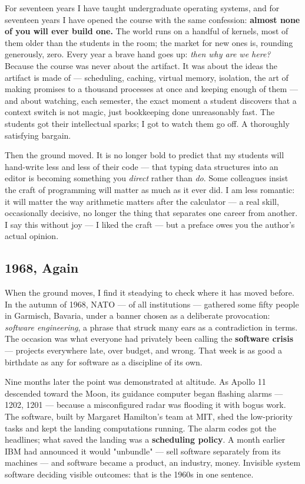 
For seventeen years I have taught undergraduate operating systems, and for seventeen years I have opened the course with the same confession: \textbf{almost none of you will ever build one.} The world runs on a handful of kernels, most of them older than the students in the room; the market for new ones is, rounding generously, zero. Every year a brave hand goes up: \textit{then why are we here?} Because the course was never about the artifact. It was about the ideas the artifact is made of — scheduling, caching, virtual memory, isolation, the art of making promises to a thousand processes at once and keeping enough of them — and about watching, each semester, the exact moment a student discovers that a context switch is not magic, just bookkeeping done unreasonably fast. The students got their intellectual sparks; I got to watch them go off. A thoroughly satisfying bargain.

Then the ground moved. It is no longer bold to predict that my students will hand-write less and less of their code — that typing data structures into an editor is becoming something you \textit{direct} rather than \textit{do}. Some colleagues insist the craft of programming will matter as much as it ever did. I am less romantic: it will matter the way arithmetic matters after the calculator — a real skill, occasionally decisive, no longer the thing that separates one career from another. I say this without joy — I liked the craft — but a preface owes you the author's actual opinion.

\subsection*{1968, Again}

When the ground moves, I find it steadying to check where it has moved before. In the autumn of 1968, NATO — of all institutions — gathered some fifty people in Garmisch, Bavaria, under a banner chosen as a deliberate provocation: \textit{software engineering}, a phrase that struck many ears as a contradiction in terms. The occasion was what everyone had privately been calling the \textbf{software crisis} — projects everywhere late, over budget, and wrong. That week is as good a birthdate as any for software as a discipline of its own.

Nine months later the point was demonstrated at altitude. As Apollo 11 descended toward the Moon, its guidance computer began flashing alarms — 1202, 1201 — because a misconfigured radar was flooding it with bogus work. The software, built by Margaret Hamilton's team at MIT, shed the low-priority tasks and kept the landing computations running. The alarm codes got the headlines; what saved the landing was a \textbf{scheduling policy}. A month earlier IBM had announced it would "unbundle" — sell software separately from its machines — and software became a product, an industry, money. Invisible system software deciding visible outcomes: that is the 1960s in one sentence.

